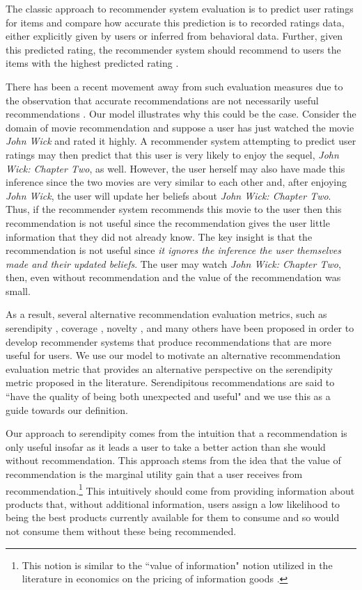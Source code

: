 \documentclass[sigconf]{acmart}
\begin{document}
The classic approach to recommender system evaluation is to predict user ratings for items and compare how accurate this prediction is to recorded ratings data, either explicitly given by users or inferred from behavioral data. Further, given this predicted rating, the recommender system should recommend to users the items with the highest predicted rating \cite{adomavicius2005toward}.
\par


There has been a recent movement away from such evaluation measures due to the observation that accurate recommendations are not necessarily useful recommendations \cite{mcnee2006being}. Our model illustrates why this could be the case. Consider the domain of movie recommendation and suppose a user has just watched the movie \textit{John Wick} and rated it highly. A recommender system attempting to predict user ratings may then predict that this user is very likely to enjoy the sequel, \textit{John Wick: Chapter Two}, as well. However, the user herself may also have made this inference since the two movies are very similar to each other and, after enjoying \textit{John Wick}, the user will update her beliefs about \textit{John Wick: Chapter Two}. Thus, if the recommender system recommends this movie to the user then this recommendation is not useful since the recommendation gives the user little information that they did not already know. The key insight is that the recommendation is not useful since \textit{it ignores the inference the user themselves made and their updated beliefs}. The user may watch \textit{John Wick: Chapter Two}, then, even without recommendation and the value of the recommendation was small.
\par

As a result, several alternative recommendation evaluation metrics, such as serendipity \cite{kotkov2016survey}, coverage \cite{ge2010beyond}, novelty \cite{vargas2011rank}, and many others have been proposed in order to develop recommender systems that produce recommendations that are more useful for users. We use our model to motivate an alternative recommendation evaluation metric that provides an alternative perspective on the serendipity metric proposed in the literature. Serendipitous recommendations are said to ``have the quality of being both unexpected and useful" \cite{maksai2015predicting} and we use this as a guide towards our definition.

Our approach to serendipity comes from the intuition that a recommendation is only useful insofar as it leads a user to take a better action than she would without recommendation. This approach stems from the idea that the value of recommendation is the marginal utility gain that a user receives from recommendation.\footnote{This notion is similar to the ``value of information" notion utilized in the literature in economics on the pricing of information goods \cite{bergemann2018design}.} This intuitively should come from providing information about products that, without additional information, users assign a low likelihood to being the best products currently available for them to consume and so would not consume them without these being recommended.
\par
\end{document}
